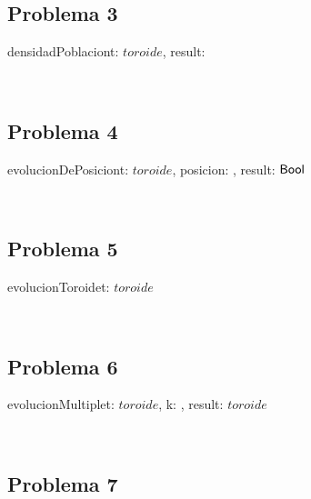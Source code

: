\documentclass[a4paper]{article}
\begin{document}
	    \subsection{Problema 3}
	
	    \begin{proc}{densidadPoblacion}{\In t: $toroide$, \Out result: \rea}{}
	    \end{proc} \\
	    
	    \subsection{Problema 4}
	    
	    \begin{proc}{evolucionDePosicion}{\In t: $toroide$, \In posicion: \ent \times \ent, \Out result: $\mathsf{Bool}$}{}
	    \end{proc} \\
	    
	    \subsection{Problema 5}
	    
	    \begin{proc}{evolucionToroide}{\Inout t: $toroide$}{}
	    \end{proc} \\
	    
	    \newpage
	    
	    \subsection{Problema 6}
	    
	    \begin{proc}{evolucionMultiple}{\In t: $toroide$, \In k: \ent, \Out result: $toroide$}{}
    	\end{proc} \\
    	
    	\subsection{Problema 7}
    	
\end{document}
